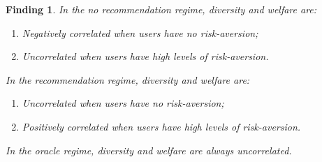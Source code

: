 \documentclass[format=acmsmall, review=false]{acmart}
\newtheorem{finding}{Finding}
\begin{document}
\begin{finding}\label{finding_diversity_welfare_corr}
In the no recommendation regime, diversity and welfare are:
\begin{enumerate}
\item Negatively correlated when users have no risk-aversion;
\item Uncorrelated when users have high levels of risk-aversion.
\end{enumerate}
In the recommendation regime, diversity and welfare are:
\begin{enumerate}
\item Uncorrelated when users have no risk-aversion;
\item Positively correlated when users have high levels of risk-aversion.
\end{enumerate}
In the oracle regime, diversity and welfare are always uncorrelated.
\end{finding}
\end{document}
